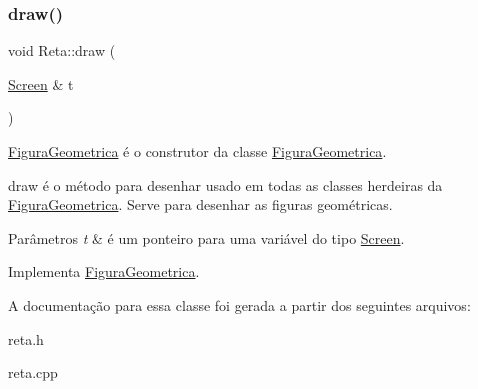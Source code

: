 \subsubsection{\texorpdfstring{draw()}{draw()}}
{\footnotesize\ttfamily void Reta\+::draw (\begin{DoxyParamCaption}\item[{\mbox{\hyperlink{class_screen}{Screen}} \&}]{t }\end{DoxyParamCaption})\hspace{0.3cm}{\ttfamily [virtual]}}



\mbox{\hyperlink{class_figura_geometrica}{Figura\+Geometrica}} é o construtor da classe \mbox{\hyperlink{class_figura_geometrica}{Figura\+Geometrica}}. 

draw é o método para desenhar usado em todas as classes herdeiras da \mbox{\hyperlink{class_figura_geometrica}{Figura\+Geometrica}}. Serve para desenhar as figuras geométricas. 
\begin{DoxyParams}{Parâmetros}
{\em t} & é um ponteiro para uma variável do tipo \mbox{\hyperlink{class_screen}{Screen}}. \\
\hline
\end{DoxyParams}


Implementa \mbox{\hyperlink{class_figura_geometrica_a8ee8dedc060b6059a805ea091aef2c41}{Figura\+Geometrica}}.



A documentação para essa classe foi gerada a partir dos seguintes arquivos\+:\begin{DoxyCompactItemize}
\item 
reta.\+h\item 
reta.\+cpp\end{DoxyCompactItemize}
